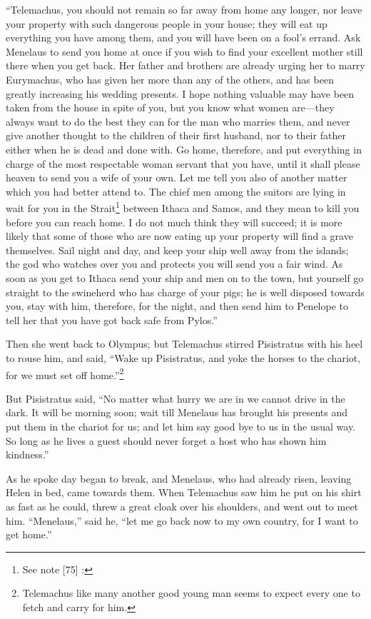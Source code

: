 “Telemachus, you should not remain so far away from home any longer, nor leave
your property with such dangerous people in your house; they will eat up
everything you have among them, and you will have been on a fool’s errand. Ask
Menelaus to send you home at once if you wish to find your excellent mother
still there when you get back. Her father and brothers are already urging her
to marry Eurymachus, who has given her more than any of the others, and has
been greatly increasing his wedding presents. I hope nothing valuable may have
been taken from the house in spite of you, but you know what women are—they
always want to do the best they can for the man who marries them, and never
give another thought to the children of their first husband, nor to their
father either when he is dead and done with. Go home, therefore, and put
everything in charge of the most respectable woman servant that you have, until
it shall please heaven to send you a wife of your own. Let me tell you also of
another matter which you had better attend to. The chief men among the suitors
are lying in wait for you in the Strait\footnote{See note [75] :} between Ithaca and Samos, and they
mean to kill you before you can reach home. I do not much think they will
succeed; it is more likely that some of those who are now eating up your
property will find a grave themselves. Sail night and day, and keep your ship
well away from the islands; the god who watches over you and protects you will
send you a fair wind. As soon as you get to Ithaca send your ship and men on to
the town, but yourself go straight to the swineherd who has charge of your
pigs; he is well disposed towards you, stay with him, therefore, for the night,
and then send him to Penelope to tell her that you have got back safe from
Pylos.”

Then she went back to Olympus; but Telemachus stirred Pisistratus with his heel
to rouse him, and said, “Wake up Pisistratus, and yoke the horses to the
chariot, for we must set off home.”\footnote{Telemachus like many another good young man seems to expect every one to
fetch and carry for him.}

But Pisistratus said, “No matter what hurry we are in we cannot drive in the
dark. It will be morning soon; wait till Menelaus has brought his presents and
put them in the chariot for us; and let him say good bye to us in the usual
way. So long as he lives a guest should never forget a host who has shown him
kindness.”

As he spoke day began to break, and Menelaus, who had already risen, leaving
Helen in bed, came towards them. When Telemachus saw him he put on his shirt as
fast as he could, threw a great cloak over his shoulders, and went out to meet
him. “Menelaus,” said he, “let me go back now to my own country, for I want to
get home.”


